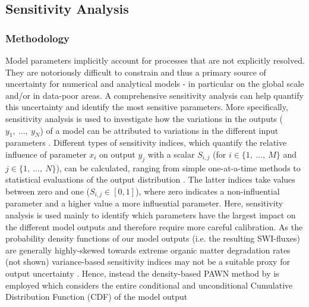 \documentclass[gmd, manuscript]{copernicus}
\begin{document}
\subsection{Sensitivity Analysis}\label{subsec:SA}
\subsubsection{Methodology}
Model parameters implicitly account for processes that are not explicitly resolved. They are notoriously difficult to constrain and thus a primary source of uncertainty for numerical and analytical models - in particular 
on the global scale and/or in data-poor areas. 
A comprehensive sensitivity analysis can help quantify this uncertainty and identify the most sensitive parameters. More specifically, sensitivity analysis is used to investigate how the variations in the outputs 
($y_1,\ ...,\ y_N$) of a model can be attributed to variations in the different input parameters \citep[$x_1,\ ...,\ x_M$,][]{pianosi_sensitivity_2016}. 
Different types of sensitivity indices, which quantify the relative influence of parameter $x_i$ on output $y_j$ with a scalar $S_{i,j}$ 
(for $i \in \{1,\ ...,\ M \}$ and $j \in \{1,\ ...,\ N \}$), can be calculated, ranging from simple one-at-a-time methods to statistical evaluations of the output 
distribution \citep[e.g. variance-based or density-based approaches][]{pianosi_sensitivity_2016}. The latter indices 
take values between zero and one ($S_{i,j} \in [0, 1]$), where zero indicates a non-influential parameter and a higher value a more influential parameter. 
Here, sensitivity analysis is used mainly to identify which parameters have the largest impact on the different model outputs and therefore require more careful calibration. 
As the probability density functions of our model outputs (i.e. the resulting SWI-fluxes) are generally highly-skewed towards extreme organic matter degradation rates (not shown) variance-based sensitivity indices 
may not be a suitable proxy for output uncertainty \citep{pianosi_sensitivity_2016}. 
Hence, instead the density-based PAWN method by \citet{pianosi_simple_2015} is employed which considers the entire conditional and unconditional Cumulative Distribution Function (CDF) of the model output
\end{document}
